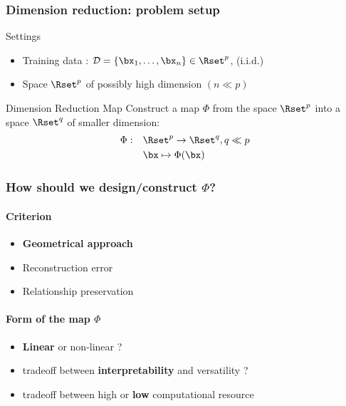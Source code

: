 \documentclass{beamer}\usepackage[]{graphicx}\usepackage[]{color}
\begin{document}
\begin{frame}
  \frametitle{Dimension reduction: problem setup}

    \begin{block}{Settings}
      \begin{itemize}
        \item \alert{Training data} : $\mathcal{D}=\{\bx_1,\ldots,\bx_n\} \in \Rset^p$,   (i.i.d.)
        \item Space $\Rset^p$ of possibly high dimension $(n \ll p)$
      \end{itemize}
    \end{block}

    \vfill
    
    \begin{block}{Dimension Reduction Map}
       Construct a map $\Phi$ from the space $\Rset^{p}$ into a space $\Rset^{q}$ of \alert{smaller dimension}:
      \begin{align*}
          \Phi:\quad & \Rset^p \to \Rset^{q}, q \ll p\\
                     & \bx \mapsto \Phi(\bx)
      \end{align*}
    \end{block}
    
\end{frame}
 
\begin{frame}
  \frametitle{How should we design/construct $\Phi$?}

  \paragraph{Criterion}
  \begin{itemize}
    \item \alert{\bf Geometrical approach}
    \item Reconstruction error
    \item Relationship preservation
  \end{itemize}

  \vfill
  
  \paragraph{Form of the map $\Phi$}
  \begin{itemize}
    \item \alert{\bf Linear} or non-linear ?
    \item tradeoff between \alert{\bf interpretability} and versatility ?
    \item tradeoff between high or \alert{\bf low} computational resource
  \end{itemize}

\end{frame}
\end{document}
